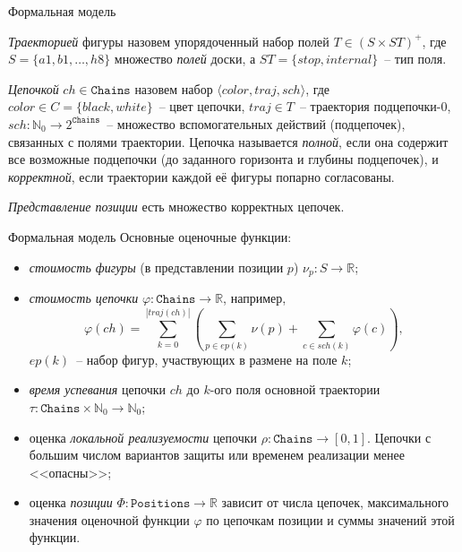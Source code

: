 \documentclass{beamer}
\begin{document}
\begin{frame}{Формальная модель}

\emph{Траекторией} фигуры назовем упорядоченный набор полей ${T} \in \left( {S} \times {ST} \right)^+$, где
${S} = \{a1, b1, \dots, h8\}$ множество \emph{полей} доски, а
${ST} = \{stop, internal\}$~-- тип поля.

\emph{Цепочкой} $ch\in{}\mathtt{Chains}$ назовем набор $\langle color, traj, sch \rangle$,  где $color \in {C}=\{black, white\}$~--  цвет цепочки, $traj \in {T}$~-- траектория подцепочки-0, $sch \colon \mathbb{N}_0 \to 2^{\mathtt{Chains}}$~-- множество вспомогательных действий (подцепочек), связанных с полями траектории.  
Цепочка называется \emph{полной}, если она содержит все возможные
подцепочки (до заданного горизонта и глубины подцепочек), и
\emph{корректной}, если траектории каждой её фигуры попарно согласованы.

\emph{Представление позиции} есть множество корректных цепочек. %
\end{frame}

\begin{frame}{Формальная модель}
Основные оценочные функции:
\begin{itemize}
\item \emph{стоимость фигуры} (в представлении позиции $p$) $\nu_{p}:{S} \to \mathbb{R}$;

\item \emph{стоимость цепочки} $\varphi \colon \mathtt{Chains} \to \mathbb{R}$, например,
$$
 \varphi \left( ch \right) = \sum\limits_{k=0}^{|traj(ch)|} \left(  \sum_{ p \in ep\left(k\right)} \nu\left(p\right) + \sum_{c \in sch\left(k\right)} \varphi\left(c\right) \right),
$$
$ep\left(k\right)$~-- набор фигур, участвующих в размене на поле $k$; 
\item \textit{время успевания} цепочки $ch$ до $k$-ого поля основной траектории $\tau \colon  \mathtt{Chains}\times\mathbb{N}_0 \to \mathbb{N}_{0} $;

\item оценка \textit{локальной реализуемости} цепочки $\rho \colon \mathtt{Chains} \to \left[0,1\right]$. Цепочки с большим числом вариантов защиты или временем реализации менее <<опасны>>;

\item оценка \textit{позиции} $\Phi \colon \mathtt{Positions} \to \mathbb{R}$
зависит от числа цепочек, максимального значения оценочной функции $\varphi$ по цепочкам позиции и суммы значений этой функции.
\end{itemize}
\end{frame}
\end{document}
